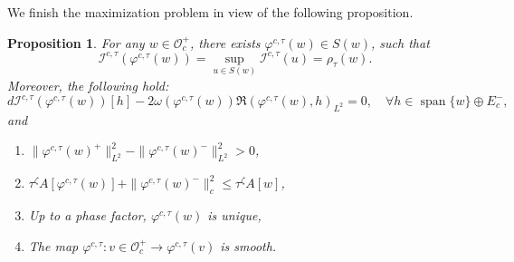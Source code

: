 \documentclass{amsart}
\theoremstyle{plain}
\newtheorem{proposition}[theorem]{Proposition}
\theoremstyle{definition}
\theoremstyle{remark}
\numberwithin{equation}{section} \numberwithin{figure}{section}
\begin{document}
We finish the maximization problem in view of the following proposition.
\begin{proposition}\label{prop:3.2}
  For any \( w \in \mathcal{O}_c^+ \), there exists \( \varphi^{c,\tau}(w) \in S(w) \), such that
  \[
  \mathcal{I}^{c,\tau}\left(\varphi^{c,\tau}(w)\right) = \sup_{u \in S(w)} \mathcal{I}^{c,\tau}(u) = \rho_\tau(w).
  \]
  Moreover, the following hold:
  \[
  d\mathcal{I}^{c,\tau}(\varphi^{c,\tau}(w))[h] - 2\omega(\varphi^{c,\tau}(w)) \Re\left(\varphi^{c,\tau}(w), h\right)_{L^2} = 0, \quad \forall h \in \operatorname{span}\{w\} \oplus E_c^-,
  \]
  and
  \begin{enumerate}
    \item[(1)] \(\|\varphi^{c,\tau}(w)^+\|_{L^2}^2 - \|\varphi^{c,\tau}(w)^-\|_{L^2}^2 > 0\),
    \item[(2)] \(\tau^\zeta A[\varphi^{c,\tau}(w)] + \|\varphi^{c,\tau}(w)^-\|_c^2 \leq \tau^{\zeta} A[w]\),
    \item[(3)] Up to a phase factor, \( \varphi^{c,\tau}(w) \) is unique,
    \item[(4)] The map \( \varphi^{c,\tau} : v \in \mathcal{O}_c^+ \to \varphi^{c,\tau}(v) \) is smooth.
  \end{enumerate}
  \end{proposition}
  
\end{document}
